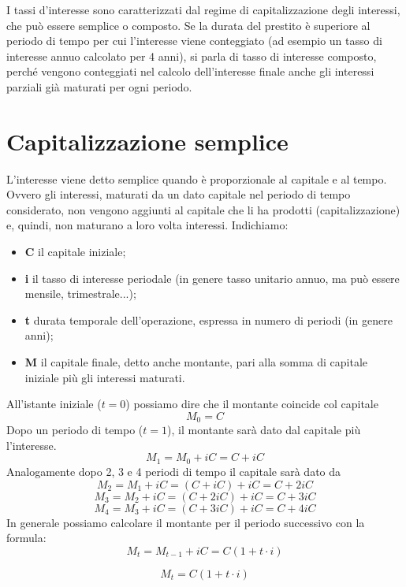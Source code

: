 \vspace{.4cm}

I tassi d'interesse sono caratterizzati dal regime di capitalizzazione degli 
interessi, che può essere semplice o composto. Se la durata del prestito è 
superiore al periodo di tempo per cui l'interesse viene conteggiato (ad esempio 
un tasso di interesse annuo calcolato per 4 anni), si parla di tasso di 
interesse composto, perché vengono conteggiati nel calcolo dell'interesse finale 
anche gli interessi parziali già maturati per ogni periodo.

\section{Capitalizzazione semplice} L'interesse viene detto semplice quando è 
proporzionale al capitale e al tempo. Ovvero gli interessi, maturati da un dato 
capitale nel periodo di tempo considerato, non vengono aggiunti al capitale che 
li ha prodotti (capitalizzazione) e, quindi, non maturano a loro volta 
interessi. Indichiamo:

\begin{itemize} \item \textbf{C} il capitale iniziale; \item \textbf{i} il tasso 
di interesse periodale (in genere tasso unitario annuo, ma può essere mensile, 
trimestrale...); \item \textbf{t} durata temporale dell'operazione, espressa in 
numero di periodi (in genere anni); \item \textbf{M} il capitale finale, detto 
anche montante, pari alla somma di capitale iniziale più gli interessi maturati. 
\end{itemize}

All'istante iniziale ($t=0$) possiamo dire che il montante coincide col capitale 
$$ M_{0}=C $$ Dopo un periodo di tempo ($t=1$), il montante sarà dato dal 
capitale più l'interesse. $$ M_{1}=M_{0} +iC = C + iC $$ Analogamente dopo 2, 3 
e 4 periodi di tempo il capitale sarà dato da $$ M_{2}=M_{1} +iC = (C + iC) +iC 
= C +2iC$$ $$ M_{3}=M_{2} +iC = (C + 2iC) +iC = C +3iC$$ $$ M_{4}=M_{3} +iC = (C 
+ 3iC) +iC = C +4iC$$ In generale possiamo calcolare il montante per il periodo 
successivo con la formula: $$ M_{t}=M_{t-1}+iC=C(1+t\cdot i) $$ 
\begin{definizione} $$ M_{t}=C(1+t\cdot i) $$ 
\end{definizione}


